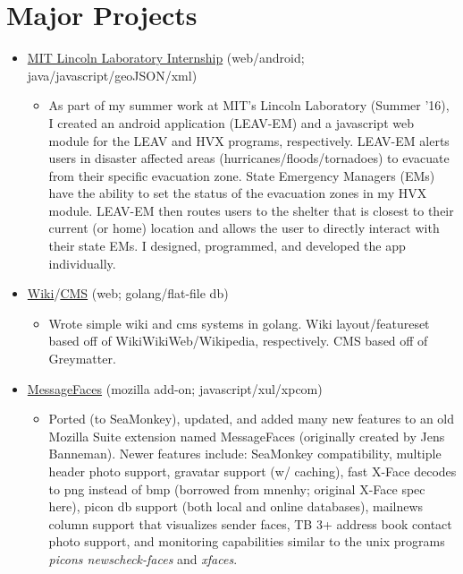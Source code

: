 \documentclass[11pt]{article}
\begin{document}
\section*{Major Projects}
\begin{itemize}
	\item \href{https://docs.google.com/presentation/d/1d6u7eK2fBJElrRpEn1KlkTfReKO_tHj5iCAGb6vgtmg/}{MIT Lincoln Laboratory Internship} (web/android; java/javascript/geoJSON/xml)
	\begin{itemize}
	\item As part of my summer work at MIT's Lincoln Laboratory (Summer '16), I created an android application (LEAV-EM) and a javascript web module for the LEAV and HVX programs, respectively. LEAV-EM alerts users in disaster affected areas (hurricanes/floods/tornadoes) to evacuate from their specific evacuation zone. State Emergency Managers (EMs) have the ability to set the status of the evacuation zones in my HVX module. LEAV-EM then routes users to the shelter that is closest to their current (or home) location and allows the user to directly interact with their state EMs. I designed, programmed, and developed the app individually.
	\end{itemize}
	\item \href{https://github.com/JohnDDuncanIII/wiki}{Wiki}/\href{https://github.com/JohnDDuncanIII/blog}{CMS} (web; golang/flat-file db)
	\begin{itemize}
	\item Wrote simple wiki and cms systems in golang. Wiki layout/featureset based off of WikiWikiWeb/Wikipedia, respectively. CMS based off of Greymatter.
	\end{itemize}
	\item \href{https://github.com/JohnDDuncanIII/MessageFaces}{MessageFaces} (mozilla add-on; javascript/xul/xpcom)
	\begin{itemize}
	\item Ported (to SeaMonkey), updated, and added many new features to an old Mozilla Suite extension named MessageFaces (originally created by Jens Banneman). Newer features include: SeaMonkey compatibility, multiple header photo support, gravatar support (w/ caching), fast X-Face decodes to png instead of bmp (borrowed from mnenhy; original X-Face spec here), picon db support (both local and online databases), mailnews column support that visualizes sender faces, TB 3+ address book contact photo support, and monitoring capabilities similar to the unix programs \textit{picons newscheck-faces} and \textit{xfaces}.

\end{itemize}
\end{itemize}
\end{document}

